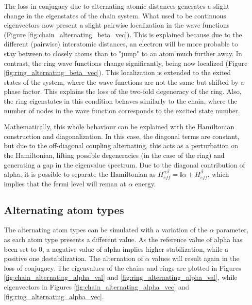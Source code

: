 \documentclass{article}
\begin{document}
The loss in conjugacy due to alternating atomic distances generates a slight change in the eigenstates of the chain system. What used to be continuous eigenvectors now present a slight pairwise localization in the wave functions (Figure \ref{fig:chain_alternating_beta_vec}). This is explained because due to the different (pairwise) interatomic distances, an electron will be more probable to stay between to closely atoms than to "jump" to an atom much further away. In contrast, the ring wave functions change significantly, being now localized (Figure \ref{fig:ring_alternating_beta_vec}). This localization is extended to the exited states of the system, where the wave functions are not the same but shifted by a phase factor. This explains the loss of the two-fold degeneracy of the ring.  Also, the ring eigenstates in this condition behaves similarly to the chain, where the number of nodes in the wave function corresponds to the excited state number.

Mathematically, this whole behaviour can be explained with the Hamiltonian construction and diagonalization. In this case, the diagonal terms are constant, but due to the off-diagonal coupling alternating, this acts as a perturbation on the Hamiltonian, lifting possible degeneracies (in the case of the ring) and generating a gap in the eigenvalue spectrum. Due to the diagonal contribution of alpha, it is possible to separate the Hamiltonian as $H_{eff}^{\alpha\beta} = \mathbb{I} \alpha + H_{eff}^\beta$, which implies that the fermi level will reman at $\alpha$ energy. 

\subsection{Alternating atom types}
The alternating atom types can be simulated with a variation of the $\alpha$ parameter, as each atom type presents a different value. As the reference value of alpha has been set to $0$, a negative value of alpha implies higher stabilization, while a positive one destabilization. The alternation of $\alpha$ values will result again in the loss of conjugacy. The eigenvalues of the chains and rings are plotted in Figures \ref{fig:chain_alternating_alpha_val} and \ref{fig:ring_alternating_alpha_val}, while eigenvectors in Figures \ref{fig:chain_alternating_alpha_vec} and \ref{fig:ring_alternating_alpha_vec}.
\end{document}
